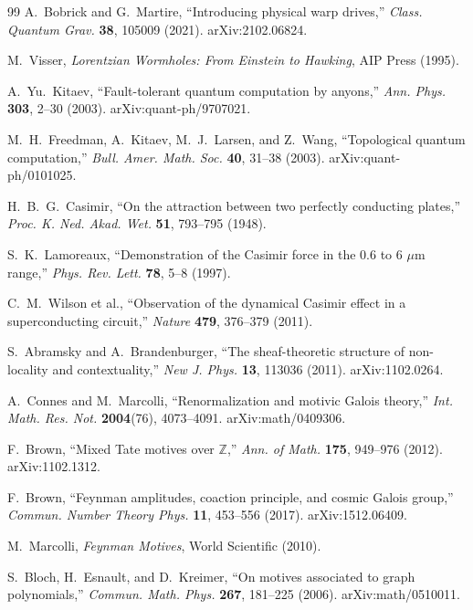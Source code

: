 \documentclass[12pt,a4paper]{article}
\theoremstyle{definition}
\begin{document}
\begin{thebibliography}{99}
A.~Bobrick and G.~Martire, ``Introducing physical warp drives,'' \textit{Class. Quantum Grav.} \textbf{38}, 105009 (2021). arXiv:2102.06824.

M.~Visser, \textit{Lorentzian Wormholes: From Einstein to Hawking}, AIP Press (1995).

A.~Yu.~Kitaev, ``Fault-tolerant quantum computation by anyons,'' \textit{Ann. Phys.} \textbf{303}, 2--30 (2003). arXiv:quant-ph/9707021.

M.~H.~Freedman, A.~Kitaev, M.~J.~Larsen, and Z.~Wang, ``Topological quantum computation,'' \textit{Bull. Amer. Math. Soc.} \textbf{40}, 31--38 (2003). arXiv:quant-ph/0101025.

H.~B.~G.~Casimir, ``On the attraction between two perfectly conducting plates,'' \textit{Proc. K. Ned. Akad. Wet.} \textbf{51}, 793--795 (1948).

S.~K.~Lamoreaux, ``Demonstration of the Casimir force in the 0.6 to 6 $\mu$m range,'' \textit{Phys. Rev. Lett.} \textbf{78}, 5--8 (1997).

C.~M.~Wilson et al., ``Observation of the dynamical Casimir effect in a superconducting circuit,'' \textit{Nature} \textbf{479}, 376--379 (2011).

S.~Abramsky and A.~Brandenburger, ``The sheaf-theoretic structure of non-locality and contextuality,'' \textit{New J. Phys.} \textbf{13}, 113036 (2011). arXiv:1102.0264.

A.~Connes and M.~Marcolli, ``Renormalization and motivic Galois theory,'' \textit{Int. Math. Res. Not.} \textbf{2004}(76), 4073--4091. arXiv:math/0409306.

F.~Brown, ``Mixed Tate motives over $\mathbb{Z}$,'' \textit{Ann. of Math.} \textbf{175}, 949--976 (2012). arXiv:1102.1312.

F.~Brown, ``Feynman amplitudes, coaction principle, and cosmic Galois group,'' \textit{Commun. Number Theory Phys.} \textbf{11}, 453--556 (2017). arXiv:1512.06409.

M.~Marcolli, \textit{Feynman Motives}, World Scientific (2010).

S.~Bloch, H.~Esnault, and D.~Kreimer, ``On motives associated to graph polynomials,'' \textit{Commun. Math. Phys.} \textbf{267}, 181--225 (2006). arXiv:math/0510011.


\end{thebibliography}
\end{document}
